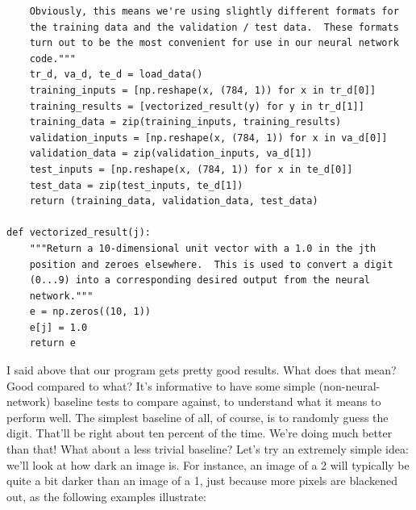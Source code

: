 \begin{lstlisting}
    Obviously, this means we're using slightly different formats for
    the training data and the validation / test data.  These formats
    turn out to be the most convenient for use in our neural network
    code."""
    tr_d, va_d, te_d = load_data()
    training_inputs = [np.reshape(x, (784, 1)) for x in tr_d[0]]
    training_results = [vectorized_result(y) for y in tr_d[1]]
    training_data = zip(training_inputs, training_results)
    validation_inputs = [np.reshape(x, (784, 1)) for x in va_d[0]]
    validation_data = zip(validation_inputs, va_d[1])
    test_inputs = [np.reshape(x, (784, 1)) for x in te_d[0]]
    test_data = zip(test_inputs, te_d[1])
    return (training_data, validation_data, test_data)

def vectorized_result(j):
    """Return a 10-dimensional unit vector with a 1.0 in the jth
    position and zeroes elsewhere.  This is used to convert a digit
    (0...9) into a corresponding desired output from the neural
    network."""
    e = np.zeros((10, 1))
    e[j] = 1.0
    return e
\end{lstlisting}

I said above that our program gets pretty good results. What does that mean? Good compared to what? It's informative to have some simple (non-neural-network) baseline tests to compare against, to understand what it means to perform well. The simplest baseline of all, of course, is to randomly guess the digit. That'll be right about ten percent of the time. We're doing much better than that!
What about a less trivial baseline? Let's try an extremely simple idea: we'll look at how dark an image is. For instance, an image of a 2 will typically be quite a bit darker than an image of a 1, just because more pixels are blackened out, as the following examples illustrate:

